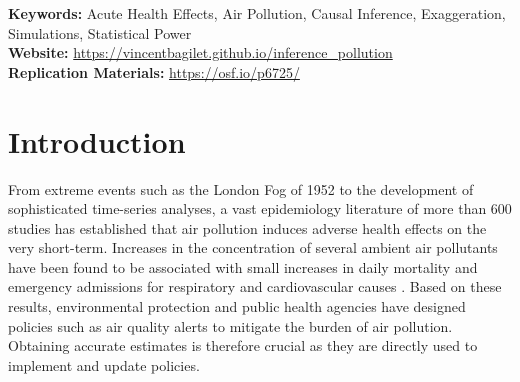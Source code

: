 \documentclass[12pt]{article}
\begin{document}
\begin{titlepage}
\begin{abstract}
\end{abstract}
\vspace{0.3cm}
{\selectfont \textbf{Keywords:}} Acute Health Effects, Air Pollution, Causal Inference, Exaggeration, Simulations, Statistical Power \\[3pt] 
{\selectfont \textbf{Website:}} \url{https://vincentbagilet.github.io/inference_pollution}\\[3pt] 
{\selectfont \textbf{Replication Materials:}} \url{https://osf.io/p6725/}
\setcounter{page}{0}
\thispagestyle{empty}
\end{titlepage}
\pagebreak \newpage

\onehalfspacing




\section{Introduction}
     
    From extreme events such as the London Fog of 1952 to the development of sophisticated time-series analyses, a vast epidemiology literature of more than 600 studies has established that air pollution induces adverse health effects on the very short-term. Increases in the concentration of several ambient air pollutants have been found to be associated with small increases in daily mortality and emergency admissions for respiratory and cardiovascular causes \citep{schwartz1994people, samet2000national, le2002short, bell2004time, liu_ambient_2019}. Based on these results, environmental protection and public health agencies have designed policies such as air quality alerts to mitigate the burden of air pollution. Obtaining accurate estimates is therefore crucial as they are directly used to implement and update policies. 
    
\end{document}
